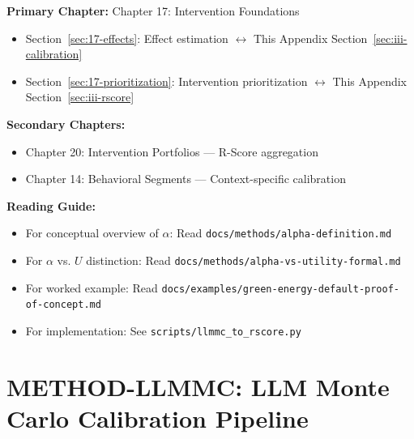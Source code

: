 
\begin{tcolorbox}[colback=purple!5!white, colframe=purple!75!black,
    title=Chapter Linkage]

\textbf{Primary Chapter:} Chapter 17: Intervention Foundations
\begin{itemize}[nosep]
\item Section~\ref{sec:17-effects}: Effect estimation $\leftrightarrow$ This Appendix Section~\ref{sec:iii-calibration}
\item Section~\ref{sec:17-prioritization}: Intervention prioritization $\leftrightarrow$ This Appendix Section~\ref{sec:iii-rscore}
\end{itemize}

\textbf{Secondary Chapters:}
\begin{itemize}[nosep]
\item Chapter 20: Intervention Portfolios --- R-Score aggregation
\item Chapter 14: Behavioral Segments --- Context-specific calibration
\end{itemize}

\textbf{Reading Guide:}
\begin{itemize}[nosep]
\item For conceptual overview of $\alpha$: Read \texttt{docs/methods/alpha-definition.md}
\item For $\alpha$ vs. $U$ distinction: Read \texttt{docs/methods/alpha-vs-utility-formal.md}
\item For worked example: Read \texttt{docs/examples/green-energy-default-proof-of-concept.md}
\item For implementation: See \texttt{scripts/llmmc\_to\_rscore.py}
\end{itemize}

\end{tcolorbox}


\chapter{METHOD-LLMMC: LLM Monte Carlo Calibration Pipeline}
\label{app:iii-llmmc}


